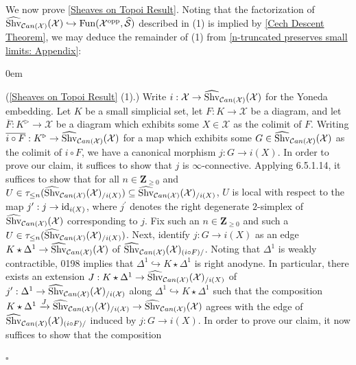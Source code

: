 \documentclass[10pt]{article}
\newcommand{\mS}{\mathcal S}
\newcommand{\C}{\mathcal C}
\newcommand{\cX}{\mathcal{X}}
\newcommand{\ZZ}{\mathbb{Z}}
\def\ZZ{{\mathbf Z}}
\renewcommand{\qed}{\hfill$\square$}
\renewenvironment{proof}{\begin{addmargin}[1em]{0em}\begin{newproof}}{\end{newproof}\end{addmargin}\qed}
\theoremstyle{witharg}
\theoremstyle{witharg}
\theoremstyle{witharg2}
\begin{document}
\noindent We now prove \ref{Sheaves on Topoi Result}. Noting that the factorization of $\widehat{\textnormal{Shv}}_{\C an(\cX)}(\cX)\hookrightarrow \textnormal{Fun}(\cX^{\textnormal{opp}},\widehat{\mS})$ described in (1) is implied by \ref{Cech Descent Theorem}, we may deduce the remainder of (1) from \ref{n-truncated preserves small limits: Appendix}:


\begin{proof} (\ref{Sheaves on Topoi Result} (1).)  Write $i:\cX\rightarrow \widehat{\textnormal{Shv}}_{\C an(\cX)}(\cX)$ for the Yoneda embedding. Let $K$ be a small simplicial set, let $F:K\rightarrow \cX$ be a diagram, and let $\overline{F}:K^\triangleright\rightarrow \cX$ be a diagram which exhibits some $X\in \cX$ as the colimit of $F$. Writing $\overline{i\circ F}:K^\triangleright\rightarrow\widehat{\textnormal{Shv}}_{\C an(\cX)}(\cX)$ for a map which exhibits some $G\in \widehat{\textnormal{Shv}}_{\C an(\cX)}(\cX)$ as the colimit of $i\circ F$, we have a canonical morphism $j:G\rightarrow i(X)$. In order to prove our claim, it suffices to show that $j$ is $\infty$-connective. Applying  6.5.1.14, it suffices to show that for all $n\in \ZZ_{\geq 0}$ and $U\in \tau_{\leq n}(\widehat{\textnormal{Shv}}_{\C an(\cX)}(\cX)_{/i(X)})\subseteq \widehat{\textnormal{Shv}}_{\C an(\cX)}(\cX)_{/i(X)}$, $U$ is local with respect to the map $j^\prime:j\rightarrow \textnormal{id}_{i(X)}$, where $j^\prime$ denotes the right degenerate $2$-simplex of $\widehat{\textnormal{Shv}}_{\C an(\cX)}(\cX)$ corresponding to $j$. Fix such an $n\in \ZZ_{\geq 0}$ and such a $U\in \tau_{\leq n}(\widehat{\textnormal{Shv}}_{\C an(\cX)}(\cX)_{/i(X)})$. Next, identify $j:G\rightarrow i(X)$ as an edge $K\star \Delta^1\rightarrow \widehat{\textnormal{Shv}}_{\C an(\cX)}(\cX)$ of $\widehat{\textnormal{Shv}}_{\C an(\cX)}(\cX)_{(i\circ F)/}$. Noting that $\Delta^1$ is weakly contractible,  0198 implies that $\Delta^1\hookrightarrow K\star \Delta^1$ is right anodyne. In particular, there exists an extension $J:K\star \Delta^1\rightarrow \widehat{\textnormal{Shv}}_{\C an(\cX)}(\cX)_{/i(X)}$ of $j^\prime:\Delta^1\rightarrow \widehat{\textnormal{Shv}}_{\C an(\cX)}(\cX)_{/i(\cX)}$ along $\Delta^1\hookrightarrow K\star \Delta^1$ such that the composition $K\star \Delta^1\xrightarrow{J}\widehat{\textnormal{Shv}}_{\C an(\cX)}(\cX)_{/i(\cX)}\rightarrow \widehat{\textnormal{Shv}}_{\C an(\cX)}(\cX)$ agrees with the edge of $\widehat{\textnormal{Shv}}_{\C an(\cX)}(\cX)_{(i\circ F)/}$ induced by $j:G\rightarrow i(X)$. In order to prove our claim, it now suffices to show that the composition 


\end{proof}
\end{document}

